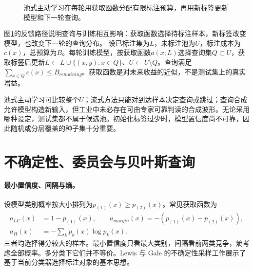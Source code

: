 \begin{figure}[htbp]
\centering
{}
\caption{池式主动学习在每轮用获取函数分配有限标注预算，再用新标签更新模型和下一轮查询。}
\label{fig:active-query-loop}
\end{figure}
图\ref{fig:active-query-loop}的反馈路径说明查询与训练相互影响：获取函数选择待标注样本，新标签改变模型，也改变下一轮的查询分布。
设已标注集为$L$，未标注池为$U$，标注成本为$c(x)$，总预算为$B$。每轮训练模型，按获取函数$a(x;L)$选择查询集$Q\subset U$，获取标签后更新$L\leftarrow L\cup\{(x,y):x\in Q\}$、$U\leftarrow U\setminus Q$。查询满足$\sum_{x\in Q}c(x)\leq B_{remaining}$。获取函数是对未来收益的近似，不是测试集上的真实增益\cite{settles2009active}。

池式主动学习可比较整个$U$；流式方法只能对到达样本决定查询或跳过；查询合成允许模型构造新输入，但工业中未必存在可由专家可靠判读的合成波形。无论采用哪种设定，测试集都不属于候选池。初始化标签过少时，模型置信度尚不可靠，因此随机或分层覆盖的种子集十分重要。

\section{不确定性、委员会与贝叶斯查询}
\paragraph{最小置信度、间隔与熵。}
设模型类别概率按大小排列为$p_{(1)}(x)\geq p_{(2)}(x)$。常见获取函数为
\begin{align}
 a_{LC}(x)&=1-p_{(1)}(x),\qquad
 a_{margin}(x)=-(p_{(1)}(x)-p_{(2)}(x)),\\
 a_H(x)&=-\sum_kp_k(x)\log p_k(x).
\end{align}
三者均选择得分较大的样本。最小置信度只看最大类别，间隔看前两类竞争，熵考虑全部概率。多分类下它们并不等价。Lewis 与 Gale 的不确定性采样工作展示了基于当前分类器选择标注对象的基本思想\cite{lewis1994uncertainty}。

